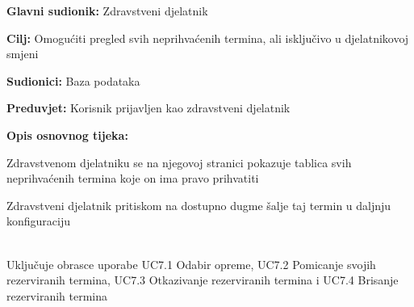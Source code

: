 \noindent {}
\begin{packed_item}
	
	\item \textbf{Glavni sudionik: }Zdravstveni djelatnik
	\item  \textbf{Cilj:} Omogućiti pregled svih neprihvaćenih termina, ali isključivo u djelatnikovoj smjeni
	\item  \textbf{Sudionici:} Baza podataka
	\item  \textbf{Preduvjet:} Korisnik prijavljen kao zdravstveni djelatnik
	\item  \textbf{Opis osnovnog tijeka:}
	
	\item[] \begin{packed_enum}
		
		\item Zdravstvenom djelatniku se na njegovoj stranici pokazuje tablica svih neprihvaćenih termina koje on ima pravo prihvatiti
		\item Zdravstveni djelatnik pritiskom na dostupno dugme šalje taj termin u daljnju konfiguraciju
	\end{packed_enum}
\end{packed_item}

\noindent {}\\
Uključuje obrasce uporabe UC7.1 Odabir opreme, UC7.2 Pomicanje svojih rezerviranih termina, UC7.3 Otkazivanje rezerviranih termina i UC7.4 Brisanje rezerviranih termina\\

